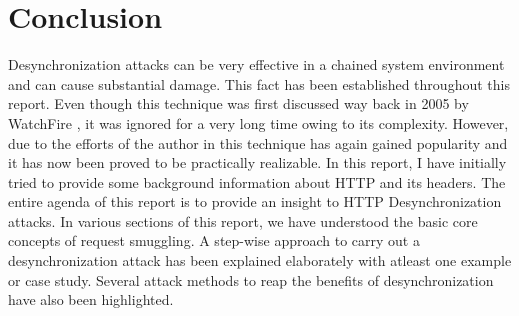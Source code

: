 \chapter{Conclusion}
Desynchronization attacks can be very effective in a chained system environment and can cause substantial damage. This fact has been established throughout this report. Even though this technique was first discussed way back in 2005 by WatchFire \cite{b5}, it was ignored for a very long time owing to its complexity. However, due to the efforts of the author in \cite{b6} this technique has again gained popularity and it has now been proved to be practically realizable. In this report, I have initially tried to provide some background information about HTTP and its headers. The entire agenda of this report is to provide an insight to HTTP Desynchronization attacks. In various sections of this report, we have understood the basic core concepts of request smuggling. A step-wise approach to carry out a desynchronization attack has been explained elaborately with atleast one example or case study. Several attack methods to reap the benefits of desynchronization have also been highlighted. 